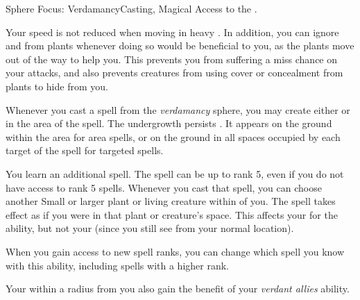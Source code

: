     \begin{magicalfeat}{Sphere Focus: Verdamancy}{Casting, Magical}
        \featpre Access to the  .

         Your speed is not reduced when moving in heavy .
        In addition, you can ignore  and  from plants whenever doing so would be beneficial to you, as the plants move out of the way to help you.
        This prevents you from suffering a miss chance on your attacks, and also prevents creatures from using cover or concealment from plants to hide from you.

         Whenever you cast a spell from the \textit{verdamancy} sphere, you may create either  or  in the area of the spell.
        The undergrowth persists .
        It appears on the ground within the area for area spells, or on the ground in all spaces occupied by each target of the spell for targeted spells.

         You learn an additional spell.
        The spell can be up to rank 5, even if you do not have access to rank 5 spells.
        Whenever you cast that spell, you can choose another Small or larger plant or living creature within \medrange of you.
        The spell takes effect as if you were in that plant or creature's space.
        This affects your  for the ability, but not your  (since you still see from your normal location).

        When you gain access to new spell ranks, you can change which spell you know with this ability, including spells with a higher rank.

         Your  within a \largearea radius  from you also gain the benefit of your \textit{verdant allies} ability.
    \end{magicalfeat}

